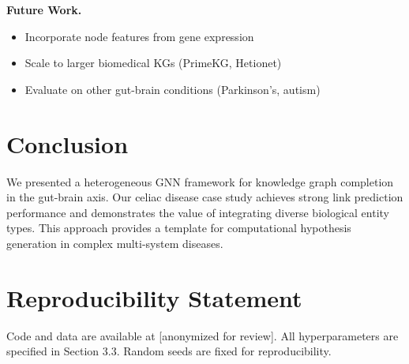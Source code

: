 \documentclass{article}
\begin{document}
\textbf{Future Work.}
\begin{itemize}
    \item Incorporate node features from gene expression
    \item Scale to larger biomedical KGs (PrimeKG, Hetionet)
    \item Evaluate on other gut-brain conditions (Parkinson's, autism)
\end{itemize}

\section{Conclusion}

We presented a heterogeneous GNN framework for knowledge graph completion in the gut-brain axis. Our celiac disease case study achieves strong link prediction performance and demonstrates the value of integrating diverse biological entity types. This approach provides a template for computational hypothesis generation in complex multi-system diseases.

\section*{Reproducibility Statement}

Code and data are available at [anonymized for review]. All hyperparameters are specified in Section 3.3. Random seeds are fixed for reproducibility.



\end{document}
